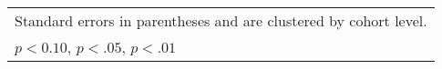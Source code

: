 \begin{table}[ht]
{\begin{tabular}{l*{2}{c}}
\hline\hline
\multicolumn{3}{l}{\footnotesize Standard errors in parentheses and are clustered by cohort level.}\\
\multicolumn{3}{l}{\footnotesize \sym{*} \(p<0.10\), \sym{**} \(p<.05\), \sym{***} \(p<.01\)}\\
\end{tabular}%
}
\end{table}